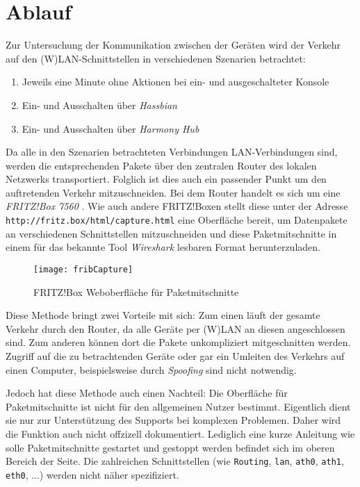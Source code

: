 \newpage
\section{Ablauf}\label{sec:ablauf}
Zur Untersuchung der Kommunikation zwischen der Geräten wird der Verkehr auf den
(W)LAN-Schnittstellen in verschiedenen Szenarien betrachtet:

\begin{enumerate}
    \setlength\itemsep{-0.5em}
    \item Jeweils eine Minute ohne Aktionen bei ein- und ausgeschalteter Konsole
    \item Ein- und Ausschalten über \textit{Hassbian}
    \item Ein- und Ausschalten über \textit{Harmony Hub}
\end{enumerate}

Da alle in den Szenarien betrachteten Verbindungen LAN-Verbindungen sind,
werden die entsprechenden Pakete über den zentralen Router des lokalen Netzwerks transportiert.
Folglich ist dies auch ein passender Punkt um den auftretenden Verkehr mitzuschneiden.
Bei dem Router handelt es sich um eine \textit{FRITZ!Box 7560} \cite{FRITZBox29:online}.
Wie auch andere FRITZ!Boxen stellt diese unter der Adresse \nolinkurl{http://fritz.box/html/capture.html} eine Oberfläche bereit,
um Datenpakete an verschiedenen Schnittstellen mitzuschneiden und diese Paketmitschnitte
in einem für das bekannte Tool \textit{Wireshark} lesbaren Format herunterzuladen.

\begin{figure}[ht!]
    \centering
    \texttt{[image: fribCapture]}
    \caption{FRITZ!Box Weboberfläche für Paketmitschnitte}\label{fig:fribCapture}
\end{figure}

Diese Methode bringt zwei Vorteile mit sich:
Zum einen läuft der gesamte Verkehr durch den Router, da alle Geräte per (W)LAN an diesen angeschlossen sind.
Zum anderen können dort die Pakete unkompliziert mitgeschnitten werden. Zugriff auf die zu betrachtenden Geräte
oder gar ein Umleiten des Verkehrs auf einen Computer, beispielsweise durch \textit{Spoofing} \cite{Maninthe12:online} sind nicht notwendig.

Jedoch hat diese Methode auch einen Nachteil:
Die Oberfläche für Paketmitschnitte ist nicht für den allgemeinen Nutzer bestimmt.
Eigentlich dient sie nur zur Unterstützung des Supports bei komplexen Problemen.
Daher wird die Funktion auch nicht offzizell dokumentiert.
Lediglich eine kurze Anleitung wie solle Paketmitschnitte gestartet und gestoppt werden befindet sich im oberen Bereich der Seite.
Die zahlreichen Schnittstellen (wie \texttt{Routing}, \texttt{lan}, \texttt{ath0}, \texttt{ath1}, \texttt{eth0}, ...) werden nicht näher spezifiziert.

